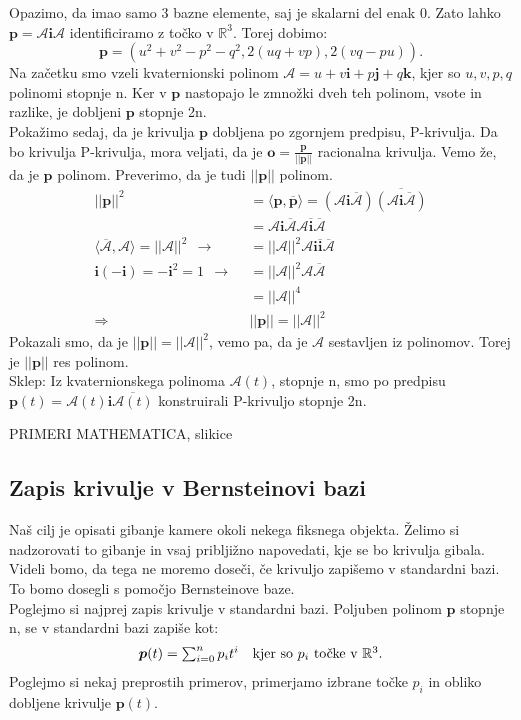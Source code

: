 \documentclass[mat1]{fmfdelo}
\newcommand{\R}{\mathbb R}
\newcommand{\ii}{\boldsymbol i}
\newcommand{\jj}{\boldsymbol j}
\newcommand{\kk}{\boldsymbol k}
\newcommand{\pp}{\boldsymbol p}
\newcommand{\A}{\mathcal A}
\begin{document}
Opazimo, da imao samo 3 bazne elemente, saj je skalarni del enak 0. Zato lahko $\pp = \A\ii\A$ identificiramo z točko v $\R^3$. Torej dobimo:
\begin{equation*}
\pp = (u^2+v^2-p^2-q^2, 2(uq+vp),2(vq-pu)).
\end{equation*}
Na začetku smo vzeli kvaternionski polinom $\A=u+v\ii+p\jj+q\kk$, kjer so $u,v,p,q$ polinomi stopnje n. Ker v $\pp$ nastopajo le zmnožki dveh teh polinom, vsote in razlike, je dobljeni $\pp$ stopnje 2n.\\
Pokažimo sedaj, da je krivulja $\pp$ dobljena po zgornjem predpisu, P-krivulja. Da bo krivulja P-krivulja, mora veljati, da je $\boldsymbol{o} = \frac{\pp}{||\pp||}$ racionalna krivulja. Vemo že, da je $\pp$ polinom. Preverimo, da je tudi $||\pp||$ polinom.
\begin{equation*}
\begin{split}
||\pp||^2 &= \langle \pp,\overline{\pp}\rangle = (\A\ii\overline{\A})\overline{(\A\ii\overline{\A})} \\
&= \A\ii\overline{\A}\A\overline{\ii} \overline{\A} \\
\langle \overline{\A}, \A \rangle = ||\A||^2 ~~ \longrightarrow ~~& = ||\A||^2 \A \ii \overline{\ii} \overline{\A} \\
\ii(-\ii) = -\ii^2 = 1 ~~ \longrightarrow ~~ & = ||\A||^2 \A \overline{\A} \\
&=||\A||^4 \\
\Longrightarrow ~~~~ & ||\pp|| = ||\A||^2
\end{split}
\end{equation*}
Pokazali smo, da je $||\pp|| = ||\A||^2$, vemo pa, da je $\A$ sestavljen iz polinomov. Torej je $||\pp||$ res polinom.\\

Sklep: Iz kvaternionskega polinoma $\A(t)$, stopnje n, smo po predpisu\\ $\pp(t) = \A(t)\ii\overline{\A(t)}$ konstruirali P-krivuljo stopnje 2n. 

PRIMERI MATHEMATICA, slikice

\subsection{Zapis krivulje v Bernsteinovi bazi}
Naš cilj je opisati gibanje kamere okoli nekega fiksnega objekta. Želimo si nadzorovati to gibanje in vsaj pribljižno napovedati, kje se bo krivulja gibala. Videli bomo, da tega ne moremo doseči, če krivuljo zapišemo v standardni bazi. To bomo dosegli s pomočjo Bernsteinove baze. \\
Poglejmo si najprej zapis krivulje v standardni bazi. Poljuben polinom $\pp$ stopnje n, se v standardni bazi zapiše kot:
\begin{equation*}
\begin{array}{c c}
\pp(t) = \sum_{i=0}^n p_i t^i & \text{kjer so $p_i$ točke v $\R^3$.}
\end{array}
\end{equation*}
Poglejmo si nekaj preprostih primerov, primerjamo izbrane točke $p_i$ in obliko dobljene krivulje $\pp(t)$.\\
\end{document}
